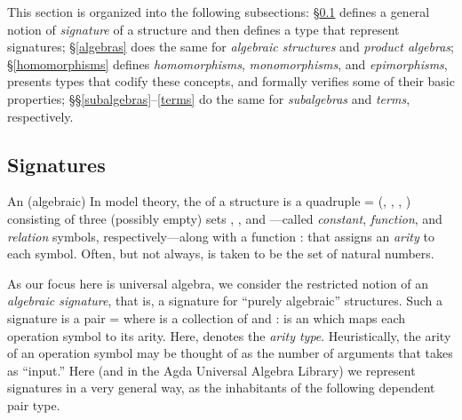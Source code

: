 This section is organized into the following subsections:
§\ref{signatures} defines a general notion of \emph{signature} of a structure and
then defines a type that represent signatures;
§\ref{algebras} does the same for \emph{algebraic structures} and \emph{product algebras};
§\ref{homomorphisms} defines \emph{homomorphisms}, \emph{monomorphisms}, and \emph{epimorphisms},
presents types that codify these concepts, and formally verifies some of their basic properties;
§§\ref{subalgebras}--\ref{terms} do the same for \emph{subalgebras} and \emph{terms}, respectively.

\subsection{Signatures}
\label{signatures}

\ifshort
An (algebraic) 
\else
In model theory, the  of a structure is a quadruple  = (,
, , ) consisting of three (possibly empty) sets , , and
---called \emph{constant}, \emph{function}, and \emph{relation} symbols,
respectively---along with a function  :  \as{+}  \as{+} 
  that assigns an \emph{arity} to each symbol. Often, but not always, 
is taken to be the set of natural numbers.

As our focus here is universal algebra, we consider the restricted notion of an
\emph{algebraic signature}, that is, a signature for ``purely algebraic'' structures. Such
a signature
\fi
is a pair  =  where  is a collection of
 and  :    is an 
which maps each operation symbol to its arity. Here,  denotes the \emph{arity type}.
Heuristically, the arity   of an operation symbol    may be
thought of as the number of arguments that  takes as ``input.''
Here (and in the Agda Universal Algebra Library) we represent signatures in a very general way, as the
inhabitants of the following dependent pair type.

